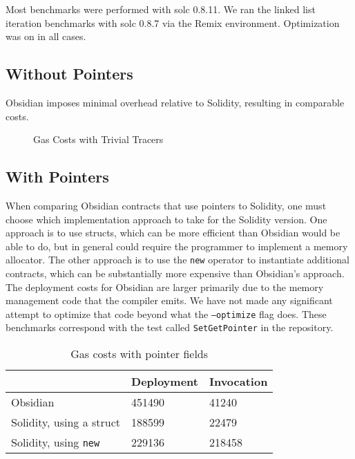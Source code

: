 Most benchmarks were performed with solc 0.8.11. We ran the linked list iteration benchmarks with solc 0.8.7 via the Remix environment. Optimization was on in all cases.

\subsection{Without Pointers}

Obsidian imposes minimal overhead relative to Solidity, resulting in comparable costs.

\begin{figure}[hbtp]
    \caption{Gas Costs with Trivial Tracers}
    \label{data.1}
\end{figure}


\subsection{With Pointers}

When comparing Obsidian contracts that use pointers to Solidity, one must choose which implementation approach to take for the Solidity version. One approach is to use structs, which can be more efficient than Obsidian would be able to do, but in general could require the programmer to implement a memory allocator. The other approach is to use the \texttt{new} operator to instantiate additional contracts, which can be substantially more expensive than Obsidian's approach. The deployment costs for Obsidian are larger primarily due to the memory management code that the compiler emits. We have not made any significant attempt to optimize that code beyond what the \texttt{--optimize} flag does. These benchmarks correspond with the test called \texttt{SetGetPointer} in the repository.

\begin{table}
\caption{Gas costs with pointer fields}
\begin{tabular}{lll}
\toprule
	 & Deployment & Invocation \\
	 \midrule
Obsidian & 451490 & 41240 \\
Solidity, using a struct & 188599 & 22479 \\
Solidity, using \texttt{new} & 229136 & 218458 \\
\bottomrule
\end{tabular}
\end{table}




